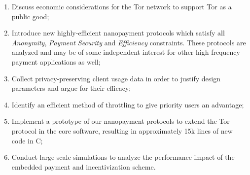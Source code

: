 \begin{enumerate}
\item Discuss economic considerations for the Tor network %
  to support Tor as a public good;
\item Introduce new highly-efficient nanopayment protocols which satisfy all
  \emph{Anonymity}, \emph{Payment Security} and \emph{Efficiency}
  constraints. These protocols are %
  analyzed and may be of some independent interest for
  other high-frequency payment applications as well;
\item Collect privacy-preserving client usage data in order to justify design parameters
  and argue for their efficacy;
\item Identify an efficient method of throttling to give priority users an
  advantage;
\item Implement a prototype of our nanopayment protocols to extend the Tor protocol
  in the core software, resulting in approximately 15k lines of new code in C; %
\item Conduct large scale simulations to analyze the performance impact of the
  embedded payment and incentivization scheme.
\end{enumerate}


